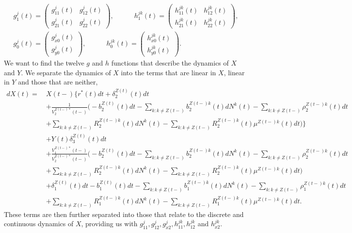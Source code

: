 \documentclass[12pt]{article}
\theoremstyle{my_thm}
\theoremstyle{my_rem}
\begin{document}
\begin{gather*}
g^j_1(t)=\begin{pmatrix}
g^j_{11}(t) & g^j_{12}(t) \\
g^j_{21}(t) & g^j_{22}(t)
\end{pmatrix},
\qquad 
\quad
h^{jk}_1(t)=\begin{pmatrix}
h^{jk}_{11}(t) & h^{jk}_{12}(t) \\
h^{jk}_{21}(t) & h^{jk}_{22}(t)
\end{pmatrix},
\\
g_0^j(t)=\begin{pmatrix}
g^j_{x0}(t) \\
g^j_{y0}(t)
\end{pmatrix},
\qquad 
\quad
h^{jk}_0(t)=\begin{pmatrix}
h^{jk}_{x0}(t) \\
h^{jk}_{y0}(t)
\end{pmatrix}.
\end{gather*}
We want to find the twelve $g$ and $h$ functions that describe the dynamics of $X$ and $Y$. We separate the dynamics of $X$ into the terms that are linear in $X$, linear in $Y$ and those that are neither,
\begin{align*}
dX(t)= \ &X(t-) \bigg\lbrace 
r^*(t)dt+\delta_2^{Z(t)}(t)dt
\\
&+
\frac{1}{V^{Z(t-)*}_2(t-)}
\bigg(
-b_2^{Z(t)}(t)dt-\sum_{k:k\neq Z(t-)}b_2^{Z(t-)k}(t)dN^k(t)
-\sum_{k:k\neq Z(t-)} \rho^{Z(t-)k}_2(t) dt
\\
&+\sum_{k:k\neq Z(t-)} R^{Z(t-)k}_2(t) dN^k(t)
-\sum_{k:k\neq Z(t-)} R^{Z(t-)k}_2(t) \mu^{Z(t-)k}(t)dt
\bigg)
\bigg\rbrace
\\
&+ Y(t)  \delta_3^{Z(t)}(t)dt
\\
&+
\frac{V^{Z(t-)*}_1(t-)}{V^{Z(t-)*}_2(t-)}
\bigg( -b_2^{Z(t)}(t)dt-\sum_{k:k\neq Z(t-)}b_2^{Z(t-)k}(t)dN^k(t)
-\sum_{k:k\neq Z(t-)} \rho^{Z(t-)k}_2(t) dt
\\
&+\sum_{k:k\neq Z(t-)} R^{Z(t-)k}_2(t) dN^k(t)
-\sum_{k:k\neq Z(t-)} R^{Z(t-)k}_2(t) \mu^{Z(t-)k}(t)dt \bigg)
\\
&+ \delta_1^{Z(t)}(t)dt 
-b_1^{Z(t)}(t)dt-\sum_{k:k\neq Z(t-)}b_1^{Z(t-)k}(t)dN^k(t)
-\sum_{k:k\neq Z(t-)} \rho^{Z(t-)k}_1(t) dt
\\
&+\sum_{k:k\neq Z(t-)} R^{Z(t-)k}_1(t) dN^k(t)
-\sum_{k:k\neq Z(t-)} R^{Z(t-)k}_1(t) \mu^{Z(t-)k}(t)dt.
\end{align*}
These terms are then further separated into those that relate to the discrete and continuous dynamics of $X$, providing us with $g_{11}^j,g_{12}^j,g_{x2}^j,h_{11}^{jk},h_{12}^{jk}$ and $h_{x2}^{jk}$.
\end{document}
